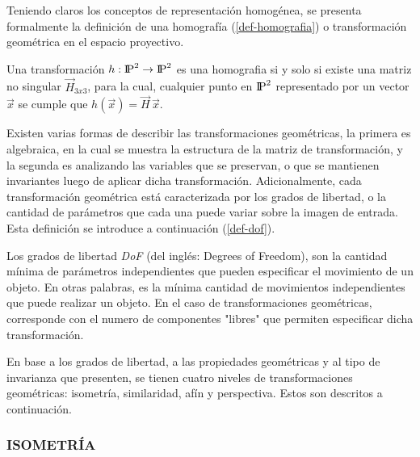 Teniendo claros los conceptos de representación homogénea, se presenta formalmente la definición de una homografía (\ref{def-homografia}) o transformación geométrica en el espacio proyectivo.
\begin{displayquote}
	\vspace{-1.5cm}
	\begin{theorem}
		Una transformación $h : {\rm I\!P}^2 \to {\rm I\!P}^2$ es una homografia si y solo si existe una matriz no singular $\vec{H}_{3x3}$, para la cual, cualquier punto en ${\rm I\!P}^2$ representado por un vector $\vec{x}$ se cumple que $h(\vec{x}) = \vec{H}\,\vec{x}$.
		\label{def-homografia}
	\end{theorem} 
\end{displayquote}

Existen varias formas de describir las transformaciones geométricas, la primera es algebraica, en la cual se muestra la estructura de la matriz de transformación, y la segunda es analizando las variables que se preservan, o que se mantienen invariantes luego de aplicar dicha transformación. Adicionalmente, cada transformación geométrica está caracterizada por los grados de libertad, o la cantidad de parámetros que cada una puede variar sobre la imagen de entrada. Esta definición se introduce a continuación (\ref{def-dof}).
\begin{displayquote}
	\vspace{-1.5cm}
	\begin{definition}
		Los grados de libertad \textit{DoF} (del inglés: Degrees of Freedom), son la cantidad mínima de parámetros independientes que pueden especificar el movimiento de un objeto. En otras palabras, es la mínima cantidad de movimientos independientes que puede realizar un objeto. En el caso de transformaciones geométricas, corresponde con el numero de componentes "libres" que permiten especificar dicha transformación.
		\label{def-dof}
	\end{definition} 
\end{displayquote}

En base a los grados de libertad, a las propiedades geométricas y al tipo de invarianza que presenten, se tienen cuatro niveles de transformaciones geométricas: isometría, similaridad, afín y perspectiva. Estos son descritos a continuación.
\subsubsection*{ISOMETRÍA}

